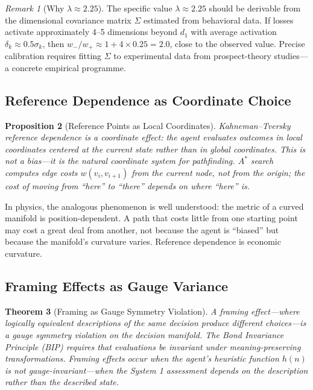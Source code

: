 \documentclass[12pt]{article}
\newtheorem{theorem}{Theorem}[section]
\newtheorem{proposition}[theorem]{Proposition}
\theoremstyle{definition}
\theoremstyle{remark}
\newtheorem{remark}[theorem]{Remark}
\begin{document}
\begin{remark}[Why $\lambda \approx 2.25$]
The specific value $\lambda \approx 2.25$ should be derivable from the dimensional covariance matrix $\Sigma$ estimated from behavioral data.  If losses activate approximately 4--5 dimensions beyond $d_1$ with average activation $\delta_k \approx 0.5\sigma_k$, then $w_- / w_+ \approx 1 + 4 \times 0.25 = 2.0$, close to the observed value.  Precise calibration requires fitting $\Sigma$ to experimental data from prospect-theory studies---a concrete empirical programme.
\end{remark}

\subsection{Reference Dependence as Coordinate Choice}

\begin{proposition}[Reference Points as Local Coordinates]
\label{prop:reference}
Kahneman--Tversky reference dependence is a coordinate effect: the agent evaluates outcomes in \emph{local coordinates centered at the current state} rather than in global coordinates.  This is not a bias---it is the natural coordinate system for pathfinding.  $A^*$ search computes edge costs $w(v_i, v_{i+1})$ from the \emph{current} node, not from the origin; the cost of moving from ``here'' to ``there'' depends on where ``here'' is.
\end{proposition}

In physics, the analogous phenomenon is well understood: the metric of a curved manifold is position-dependent.  A path that costs little from one starting point may cost a great deal from another, not because the agent is ``biased'' but because the manifold's curvature varies.  Reference dependence is economic curvature.

\subsection{Framing Effects as Gauge Variance}

\begin{theorem}[Framing as Gauge Symmetry Violation]
\label{thm:framing}
A framing effect---where logically equivalent descriptions of the same decision produce different choices---is a \emph{gauge symmetry violation} on the decision manifold.  The Bond Invariance Principle (BIP) \cite{bond2026geometric} requires that evaluations be invariant under meaning-preserving transformations.  Framing effects occur when the agent's heuristic function $h(n)$ is not gauge-invariant---when the System 1 assessment depends on the description rather than the described state.
\end{theorem}
\end{document}
